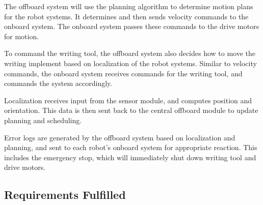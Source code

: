 The offboard system will use the planning algorithm to determine motion plans for the robot systems. It determines and then sends velocity commands to the onboard system. The onboard system passes these commands to the drive motors for motion.

To command the writing tool, the offboard system also decides how to move the writing implement based on localization of the robot systems. Similar to velocity commands, the onboard system receives commands for the writing tool, and commands the system accordingly.

Localization receives input from the sensor module, and computes position and orientation. This data is then sent back to the central offboard module to update planning and scheduling.

Error logs are generated by the offboard system based on localization and planning, and sent to each robot's onboard system for appropriate reaction. This includes the emergency stop, which will immediately shut down writing tool and drive motors.

\subsection{Requirements Fulfilled}

